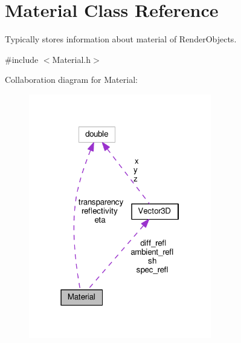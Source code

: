 \hypertarget{classMaterial}{}\section{Material Class Reference}
\label{classMaterial}


Typically stores information about material of Render\+Objects.  




{\ttfamily \#include $<$Material.\+h$>$}



Collaboration diagram for Material\+:\nopagebreak
\begin{figure}[H]
\begin{center}
\leavevmode
\includegraphics[width=226pt]{classMaterial__coll__graph}
\end{center}
\end{figure}

